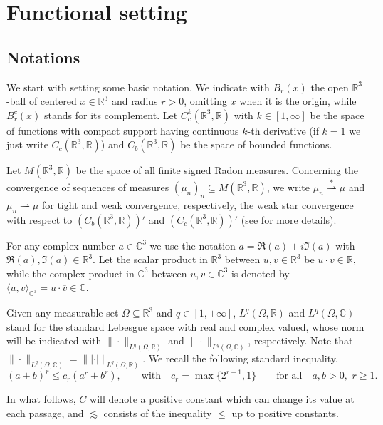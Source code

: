 \documentclass[leqno,11pt]{amsart}
\newcommand{\R}{\mathbb R}
\newcommand{\CC}{\mathbb C}
\numberwithin{equation}{section}
\begin{document}
\section{Functional setting}
\label{Section:funct:sett}



\subsection{Notations}

We start with setting some basic notation. We indicate with $B_r(x)$ the open $\R^3 $-ball of centered $x\in\R^3$ and radius $r>0$, omitting $x$ when it is the origin, while $B_r^c(x)$ stands for its complement.
Let $C_c^k(\R^3,\R)$ with $k\in[1,\infty]$ be the space of functions with compact support having continuous $k$-th derivative (if $k=1$ we just write $C_c(\R^3,\R)$) and $C_b(\R^3,\R)$ be the space of bounded functions.


Let $M(\R^3,\R)$ be the space of all finite signed Radon measures. Concerning the convergence of sequences of measures $(\mu_n)_n\subseteq M(\R^3,\R)$, we write $\mu_n\stackrel{*}{\rightharpoonup}\mu$ and $\mu_n\rightharpoonup\mu$ for tight and weak convergence, respectively, the weak star convergence with respect to $(C_b(\R^3,\R))'$ and $(C_c(\R^3,\R))'$ (see \cite{BBF} for more details).

For any complex number $a\in\CC^3$  we use the notation 
$a=\Re(a)+i\Im(a)$ with $\Re(a),\Im(a)\in \R^3$.
Let the scalar product in $\R^3$ between $u,v\in\R^3$ be $u\cdot v\in\R$, while the complex product in $\CC^3$ between $u,v\in\CC^3$ is denoted by $\langle u,v\rangle_{\CC^3}=u \cdot \overline{v}\in\CC$.  

Given any measurable set $\Omega\subseteq \R^3$ and $q\in[1,+\infty]$, $L^q(\Omega, \R)$ and $L^q(\Omega, \CC)$ stand for the standard Lebesgue space with real and complex valued, whose norm will be indicated with $\|\cdot\|_{L^q(\Omega, \R)}$ and $\|\cdot\|_{L^q(\Omega, \CC)}$, respectively. Note that $\|\cdot\|_{L^q(\Omega, \CC)}=\||\cdot|\|_{L^q(\Omega, \R)}$.
We recall the following standard inequality.
\begin{equation}\label{standard}
(a+b)^r\le c_r(a^r+b^r), \qquad \text{with}\quad c_r=\max\{2^{r-1},1\}\qquad \text{for all}\quad a,b>0,\,\, r\ge1.
\end{equation}

In what follows, $C$ will denote a positive constant which can change its value at each passage, and $\lesssim$ consists of the inequality $\le$ up to positive constants.
\end{document}
